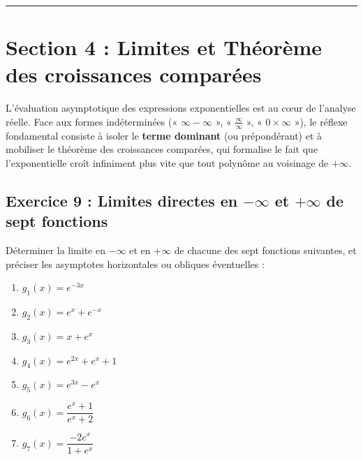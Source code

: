 \documentclass[11pt,a4paper]{article}
\begin{document}
\vspace{0.8cm}
\hrule
\vspace{0.8cm}
\section{Section 4 : Limites et Théorème des croissances comparées}

L'évaluation asymptotique des expressions exponentielles est au cœur de l'analyse réelle. Face aux formes indéterminées (« $\infty - \infty$ », « $\frac{\infty}{\infty}$ », « $0 \times \infty$ »), le réflexe fondamental consiste à isoler le \textbf{terme dominant} (ou prépondérant) et à mobiliser le théorème des croissances comparées, qui formalise le fait que l'exponentielle croît infiniment plus vite que tout polynôme au voisinage de $+\infty$.

\subsection*{Exercice 9 : Limites directes en $-\infty$ et $+\infty$ de sept fonctions}

Déterminer la limite en $-\infty$ et en $+\infty$ de chacune des sept fonctions suivantes, et préciser les asymptotes horizontales ou obliques éventuelles :
\begin{enumerate}[label=\textbf{\arabic*.}]
    \item $g_1(x) = e^{-3x}$
    \item $g_2(x) = e^x + e^{-x}$
    \item $g_3(x) = x + e^x$
    \item $g_4(x) = e^{2x} + e^x + 1$
    \item $g_5(x) = e^{3x} - e^x$
    \item $g_6(x) = \dfrac{e^x + 1}{e^x + 2}$
    \item $g_7(x) = \dfrac{-2e^x}{1 + e^x}$
\end{enumerate}
\end{document}
